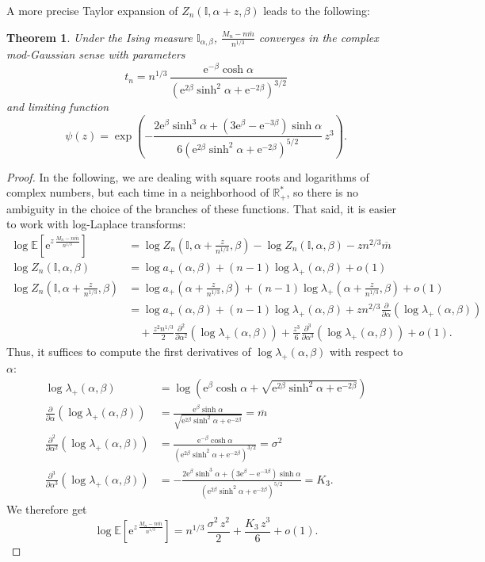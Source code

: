 \documentclass[12pt,a4paper,reqno]{amsart}
\newcommand{\R}{\mathbb{R}}
\newcommand{\E}{\mathrm{e}}
\newcommand{\esper}{\mathbb{E}}
\newcommand{\IS}{\mathbb{I}}
\newtheorem{theorem}{Theorem}
\theoremstyle{remark}
\begin{document}
A more precise Taylor expansion of $Z_n(\IS,\alpha+z,\beta)$ leads to the following:

\begin{theorem}\label{thm:modgaussising}
Under the Ising measure $\IS_{\alpha,\beta}$, $\frac{M_n-n\overline{m}}{n^{1/3}}$ converges in the complex mod-Gaussian sense with parameters $$t_n = n^{1/3}\,\frac{\E^{-\beta}\cosh \alpha}{(\E^{2\beta}\sinh^2\alpha+\E^{-2\beta})^{3/2}}$$
and limiting function
$$\psi(z)=\exp\left(-\frac{2\E^{\beta}\sinh^3 \alpha+(3\E^{\beta}-\E^{-3\beta})\sinh\alpha}{6(\E^{2\beta}\sinh^2\alpha+\E^{-2\beta})^{5/2}}\,z^3\right).$$
\end{theorem}

\begin{proof} In the following, we are dealing with square roots and logarithms of complex numbers, but each time in a neighborhood of $\R_+^*$, so there is no ambiguity in the choice of the branches of these functions. That said, it is easier to work with log-Laplace transforms:
\begin{align*}
\log \esper\!\left[\E^{z\,\frac{M_n-n\overline{m}}{n^{1/3}}}\right]&= \log Z_n\left(\IS,\alpha + \frac{z}{n^{1/3}},\beta\right)-\log Z_n(\IS,\alpha,\beta)-zn^{2/3}\overline{m}\\
\log Z_n(\IS,\alpha,\beta) &= \log a_+(\alpha,\beta) + (n-1) \log \lambda_+(\alpha,\beta) + o(1)\\
\log Z_n\left(\IS,\alpha+ \frac{z}{n^{1/3}},\beta\right) &= \log a_+\left(\alpha+ \frac{z}{n^{1/3}},\beta\right) + (n-1) \log \lambda_+\left(\alpha+ \frac{z}{n^{1/3}},\beta\right) + o(1)\\
&= \log a_+(\alpha,\beta) + (n-1) \log \lambda_+(\alpha,\beta)+zn^{2/3} \frac{\partial}{\partial \alpha}\left(\log \lambda_+(\alpha,\beta)\right)\\
&\quad + \frac{z^2n^{1/3}}{2} \frac{\partial^2}{\partial \alpha^2}\left(\log \lambda_+(\alpha,\beta)\right) + \frac{z^3}{6} \frac{\partial^3}{\partial \alpha^3}\left(\log \lambda_+(\alpha,\beta)\right) +o(1).
\end{align*}
Thus, it suffices to compute the first derivatives of $\log \lambda_+(\alpha,\beta)$ with respect to $\alpha$:
\begin{align*}
\log \lambda_+(\alpha,\beta)&=\log\left(\E^{\beta}\cosh\alpha + \sqrt{\E^{2\beta}\sinh^2 \alpha + \E^{-2\beta}}\right)\\
\frac{\partial}{\partial \alpha}\left(\log \lambda_+(\alpha,\beta)\right)&=\frac{\E^{\beta}\sinh\alpha}{\sqrt{\E^{2\beta} \sinh^2 \alpha + \E^{-2\beta}}}=\overline{m}\\
\frac{\partial^2}{\partial \alpha^2}\left(\log \lambda_+(\alpha,\beta)\right)&=\frac{\E^{-\beta}\cosh \alpha}{(\E^{2\beta}\sinh^2\alpha+\E^{-2\beta})^{3/2}}=\sigma^2\\
\frac{\partial^3}{\partial \alpha^3}\left(\log \lambda_+(\alpha,\beta)\right)&=-\frac{2\E^{\beta}\sinh^3 \alpha+(3\E^{\beta}-\E^{-3\beta})\sinh\alpha}{(\E^{2\beta}\sinh^2\alpha+\E^{-2\beta})^{5/2}}=K_3.
\end{align*}
We therefore get
$$\log \esper\!\left[\E^{z\,\frac{M_n-n\overline{m}}{n^{1/3}}}\right] = n^{1/3}\,\frac{\sigma^2\, z^2}{2}+\frac{K_3\,z^3}{6}+o(1).$$
\end{proof}
\bigskip
\end{document}
